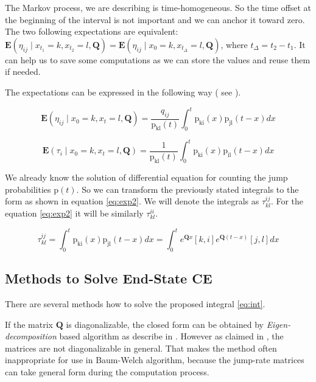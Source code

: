 \documentclass[thesis=M,english]{FITthesis}[2012/10/20]
\newcommand{\matr}[1]{\mathbf{#1}}
\begin{document}
The Markov process, we are describing is time-homogeneous. So the time offset at the beginning of the interval is not important and we can anchor it toward zero. The two following expectations are equivalent: $\mathbf{E}(\eta_{ij} \mid x_{t_1} = k, x_{t_2} = l, \matr{ Q } ) = \mathbf{E}(\eta_{ij} \mid x_0 = k, x_{t_\Delta} = l, \matr{ Q } )$, where ${t_\Delta} = {t_2} - {t_1}$. It can help us to save some computations as we can store the values and reuse them if needed.

The expectations can be expressed in the following way ( see \cite{Ho05} ).   

\begin{equation}\label{eq:exp1}
\mathbf{E}(\eta_{ij} \mid x_0 = k, x_t = l, \matr{ Q } ) = \frac{ q_{ij} }{ \mathrm{p_{kl}}(t) } 
\int_{0}^{t} \mathrm{p_{ki}}(x) \mathrm{p_{jl}}(t-x) dx
\end{equation}

\begin{equation}\label{eq:exp2}
\mathbf{E}( \tau_i \mid x_0 = k, x_t = l, \matr{ Q } ) = \frac{ 1 }{ \mathrm{p_{kl}}(t) } 
\int_{0}^{t} \mathrm{p_{ki}}(x) \mathrm{p_{il}}(t-x) dx
\end{equation}

We already know the solution of differential equation for counting the jump probabilities $\mathrm{p}(t)$. So we can transform the previously stated integrals to the form as shown in equation \eqref{eq:exp2}. We will denote the integrals as $\tau^{ij}_{kl}$. For the equation \eqref{eq:exp2} it will be similarly $\tau^{ii}_{kl}$. 

\begin{equation}\label{eq:int}
\tau^{ij}_{kl} = \int_{0}^{t} \mathrm{p_{ki}}(x) \mathrm{p_{jl}}(t-x) dx = 
\int_{0}^{t} {e^{\matr{Q}x}}[k,i] {e^{\matr{Q}(t-x)}}[j,l] dx
\end{equation} 

\subsection{Methods to Solve End-State CE }\label{sec:solve}

There are several methods how to solve the proposed integral \eqref{eq:int}. 

If the matrix $\matr{Q}$ is diagonalizable, the closed form can be obtained by \textit{Eigen-decomposition} based algorithm as describe in \cite{Me07}. However as claimed in \cite{Li15}, the matrices are not diagonalizable in general. That makes the method often inappropriate for use in Baum-Welch algorithm, because the jump-rate matrices can take general form during the computation process.
\end{document}
